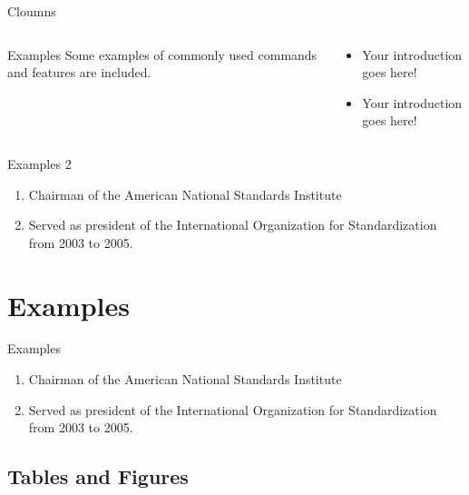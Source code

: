 \documentclass[aspectratio=169]{beamer}
\begin{document}
\begin{frame}{Cloumns}

\begin{columns}
  \begin{column}{0.5\textwidth}
    \begin{block}{Examples}
      Some examples of commonly used commands and features are included.
    \end{block}
  \end{column}
  \begin{column}{0.45\textwidth}  %
    \begin{itemize}
      \item Your introduction goes here!
      \item Your introduction goes here!
    \end{itemize}
  \end{column}
\end{columns}

\vskip 1cm

\begin{alertblock}{Examples 2}
  \begin{enumerate}
    \item Chairman of the American National Standards Institute 
    \item Served as president of the International Organization for Standardization from 2003 to 2005.
  \end{enumerate}
\end{alertblock}

\end{frame}

\section{Examples}

\begin{frame}{Examples}

  \begin{enumerate}
      \item Chairman of the American National Standards Institute 
      \item Served as president of the International Organization for Standardization from 2003 to 2005.
  \end{enumerate}
  
\end{frame}

\subsection{Tables and Figures}
\end{document}
